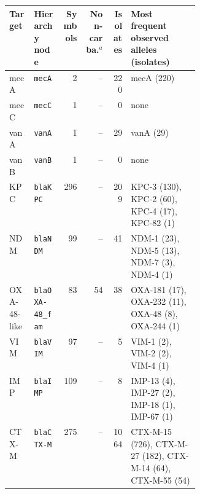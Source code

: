 \begin{tabular}{llrrrp{0.36\linewidth}}
\hline\hline
Target & Hierarchy node & Symbols & Non-carba.$^{a}$ & Isolates & Most frequent observed alleles (isolates) \\
\hline
mecA & \texttt{mecA} & 2 & -- & 220 & mecA (220) \\
mecC & \texttt{mecC} & 1 & -- & 0 & none \\
vanA & \texttt{vanA} & 1 & -- & 29 & vanA (29) \\
vanB & \texttt{vanB} & 1 & -- & 0 & none \\
KPC & \texttt{blaKPC} & 296 & -- & 209 & KPC-3 (130), KPC-2 (60), KPC-4 (17), KPC-82 (1) \\
NDM & \texttt{blaNDM} & 99 & -- & 41 & NDM-1 (23), NDM-5 (13), NDM-7 (3), NDM-4 (1) \\
OXA-48-like & \texttt{blaOXA-48\_fam} & 83 & 54 & 38 & OXA-181 (17), OXA-232 (11), OXA-48 (8), OXA-244 (1) \\
VIM & \texttt{blaVIM} & 97 & -- & 5 & VIM-1 (2), VIM-2 (2), VIM-4 (1) \\
IMP & \texttt{blaIMP} & 109 & -- & 8 & IMP-13 (4), IMP-27 (2), IMP-18 (1), IMP-67 (1) \\
CTX-M & \texttt{blaCTX-M} & 275 & -- & 1064 & CTX-M-15 (726), CTX-M-27 (182), CTX-M-14 (64), CTX-M-55 (54) \\
\hline\hline
\end{tabular}
